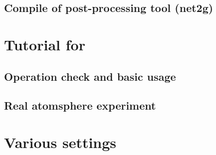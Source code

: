 \documentclass[a4paper]{report}
\begin{document}
 \chapter{Compile of post-processing tool (net2g)}
 


\part{Tutorial for \scalerm}
 \chapter{Operation check and basic usage} \label{chap:tutorial_ideal}
 
 
 
 


 \chapter{Real atomsphere experiment} \label{chap:tutorial_real}
 
 
 
 
 
 
 


% 
% 
% 


\part{Various settings} \label{part:basic_usel}
\end{document}
